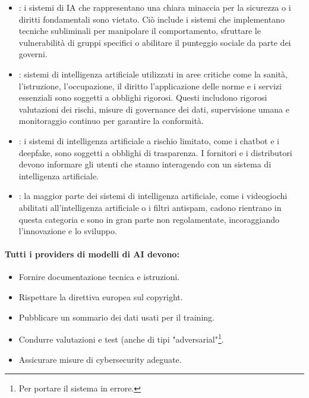 \begin{itemize}
  \item {}: i sistemi di IA che rappresentano una chiara minaccia per la sicurezza o i diritti fondamentali sono vietato. Ciò include i sistemi che implementano tecniche subliminali per manipolare il comportamento, sfruttare le vulnerabilità di gruppi specifici o abilitare il punteggio sociale da parte dei governi.
  \item  {}: sistemi di intelligenza artificiale utilizzati in aree critiche come la sanità, l'istruzione, l'occupazione, il diritto l'applicazione delle norme e i servizi essenziali sono soggetti a obblighi rigorosi. Questi includono rigorosi valutazioni dei rischi, misure di governance dei dati, supervisione umana e monitoraggio continuo per garantire la conformità. 
  \item {}: i sistemi di intelligenza artificiale a rischio limitato, come i chatbot e i deepfake, sono soggetti a obblighi di trasparenza. I fornitori e i distributori devono informare gli utenti che stanno interagendo con un sistema di intelligenza artificiale. 
  \item {}: la maggior parte dei sistemi di intelligenza artificiale, come i videogiochi abilitati all'intelligenza artificiale o i filtri antispam, cadono rientrano in questa categoria e sono in gran parte non regolamentate, incoraggiando l'innovazione e lo sviluppo.
\end{itemize}

\paragraph{Tutti i providers di modelli di AI devono:}

\begin{itemize}
  \item Fornire documentazione tecnica e istruzioni. 
  \item Rispettare la direttiva europea sul copyright. 
  \item Pubblicare un sommario dei dati usati per il training. 
  \item Condurre valutazioni e test (anche di tipi "adversarial"\footnote{Per portare il sistema in errore.}. 
  \item Assicurare misure di cybersecurity adeguate.
\end{itemize}


